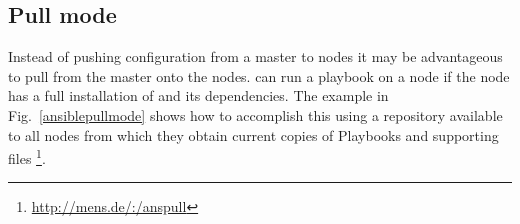 \subsection*{Pull mode}

Instead of pushing configuration from a master to nodes it may be advantageous to pull from the master onto the nodes.
\ansible{} can run a playbook on a node if the node has a full installation of \ansible{} and its dependencies.
The example in Fig.~\ref{ansiblepullmode} shows how to accomplish this using a repository available to all nodes from which they obtain current copies of Playbooks and supporting files
\footnote{\url{http://mens.de/:/anspull}}.

